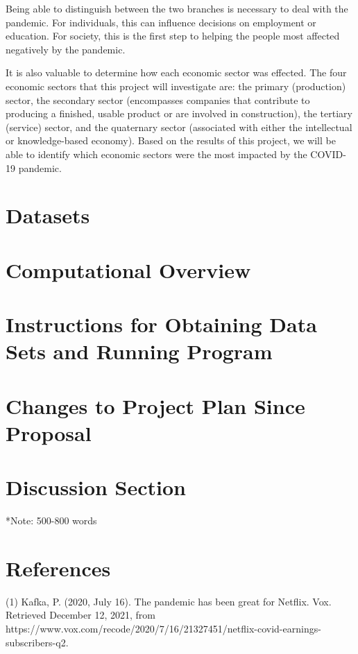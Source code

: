 \documentclass[fontsize=11pt]{article}
\begin{document}
Being able to distinguish between the two branches is necessary to deal with the pandemic. For individuals, this can influence decisions on employment or education. For society,  this is the first step to helping the people most affected negatively by the pandemic.

It is also valuable to determine how each economic sector was effected. The four economic sectors that this project will investigate are: the primary (production) sector, the secondary sector (encompasses companies that contribute to producing a finished, usable product or are involved in construction), the tertiary (service) sector, and the quaternary sector (associated with either the intellectual or knowledge-based economy). Based on the results of this project, we will be able to identify which economic sectors were the most impacted by the COVID-19 pandemic. 

\section{Datasets}

\section{Computational Overview }



\section{Instructions for Obtaining Data Sets and Running Program}

\section{Changes to Project Plan Since Proposal}

\section{Discussion Section}
*Note: 500-800 words

\section{References}

(1) Kafka, P. (2020, July 16). The pandemic has been great for Netflix. Vox. Retrieved December 12, 2021, from https://www.vox.com/recode/2020/7/16/21327451/netflix-covid-earnings-subscribers-q2. 
\end{document}
